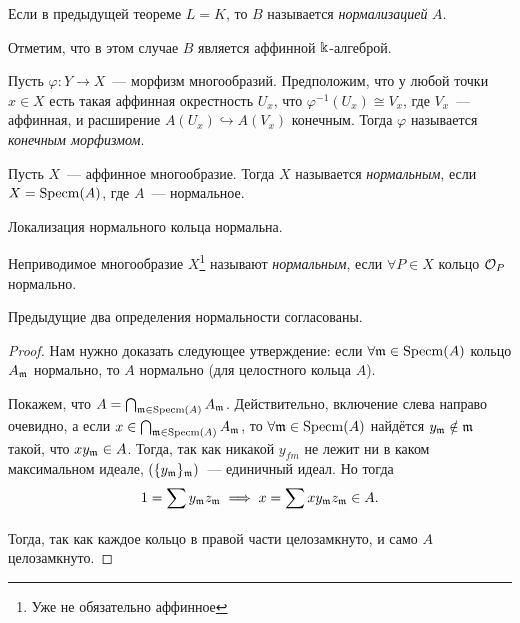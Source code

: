 	 	\begin{definition} 
	 		Если в предыдущей теореме $L = K$, то $B$ называется \emph{нормализацией} $A$.
	 	\end{definition}

	 	\begin{remark}
	 		Отметим, что в этом случае $B$ является аффинной $\Bbbk$-алгеброй. 
	 	\end{remark}

	 	\begin{definition} 
	 		Пусть $\varphi\colon Y \to X$~--- морфизм многообразий. Предположим, что у любой точки $x \in X$ есть такая аффинная окрестность $U_x$, что $\varphi^{-1}(U_x) \cong V_x$, где $V_x$~--- аффинная, и расширение $A(U_x) \hookrightarrow A(V_x)$ конечным. Тогда $\varphi$ называется \emph{конечным морфизмом}. 
	 	\end{definition}

	 	\begin{definition} 
	 		Пусть $X$~--- аффинное многообразие. Тогда $X$ называется \emph{нормальным}, если $X = \operatorname{Specm}(A)$, где $A$~--- нормальное.
	 	\end{definition}

	 	\begin{remark}
	 		Локализация нормального кольца нормальна. 
	 	\end{remark}

	 	\begin{definition} 
	 		Неприводимое многообразие $X$\footnote{Уже не обязательно аффинное} называют \emph{нормальным}, если $\forall P \in X$ кольцо $\mathcal{O}_{P}$ нормально. 
	 	\end{definition}

	 	\begin{statement} 
	 		Предыдущие два определения нормальности согласованы.  
	 	\end{statement}
	 	\begin{proof}
	 		Нам нужно доказать следующее утверждение: если $\forall \mathfrak{m} \in \operatorname{Specm}(A)$ кольцо $A_{\mathfrak{m}}$ нормально, то $A$ нормально (для целостного кольца $A$).

	 		Покажем, что $A = \bigcap_{\mathfrak{m} \in \operatorname{Specm}(A)} A_{\mathfrak{m}}$. Действительно, включение слева направо очевидно, а если $x \in \bigcap_{\mathfrak{m} \in \operatorname{Specm}(A)} A_{\mathfrak{m}}$, то $\forall \mathfrak{m} \in \operatorname{Specm}(A)$ найдётся $y_{\mathfrak{m}} \notin \mathfrak{m}$ такой, что $xy_{\mathfrak{m}} \in A$. Тогда, так как никакой $y_{fm}$ не лежит ни в каком максимальном идеале, $(\{ y_{\mathfrak{m}}\}_{\mathfrak{m}})$~--- единичный идеал. Но тогда 
	 		\[
	 			1 = \sum y_{\mathfrak{m}} z_{\mathfrak{m}} \implies x = \sum_{} x y_{\mathfrak{m}} z_{\mathfrak{m}} \in A.
	 		\]
	 		Тогда, так как каждое кольцо в правой части целозамкнуто, и само $A$ целозамкнуто. 
	 	\end{proof}

	 	
	 	